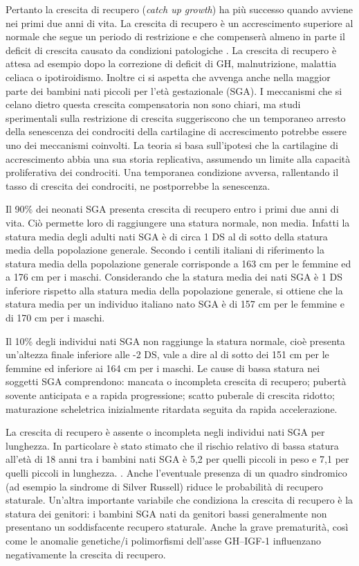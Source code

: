  Pertanto la crescita di recupero (\textit{catch up growth}) ha più successo quando avviene nei primi due anni di vita. La crescita di recupero è un accrescimento superiore al normale che segue un periodo di restrizione e che compenserà almeno in parte il deficit di crescita causato da condizioni patologiche \cite{boersma1997catch}.
La crescita di recupero è attesa ad esempio dopo la correzione di deficit di GH, malnutrizione, malattia celiaca o ipotiroidismo. Inoltre ci si aspetta che avvenga anche nella maggior parte dei bambini nati piccoli per l'età gestazionale (SGA). I meccanismi che si celano dietro questa crescita compensatoria non sono chiari, ma studi sperimentali sulla restrizione di crescita suggeriscono che un temporaneo arresto della senescenza dei condrociti della cartilagine di accrescimento potrebbe essere uno dei meccanismi 
coinvolti.
La teoria si basa sull'ipotesi che la cartilagine di accrescimento abbia una sua storia replicativa, assumendo un limite alla capacità proliferativa dei condrociti. Una temporanea condizione avversa, rallentando il tasso di crescita dei condrociti, ne postporrebbe la senescenza.\cite{gafni2001catch} 


Il 90\% dei neonati SGA presenta crescita di recupero entro i primi due anni di
vita\cite{karlberg1995growth}. Ciò permette loro di raggiungere una statura normale, non media. Infatti la statura media degli adulti nati SGA è di circa 1 DS al di sotto della statura 
media della popolazione generale\cite{leger1997reduced}. Secondo i centili italiani di riferimento \cite{cacciari2006italian} la statura media della popolazione generale corrisponde a 163 cm per le femmine ed a 176 cm per i maschi. Considerando che la statura media dei nati SGA è 1 DS inferiore rispetto alla statura media della popolazione generale,   
si ottiene che la statura media per un individuo italiano nato SGA è di 157 cm per le femmine e di 170 cm per i maschi. 


Il 10\% degli individui nati SGA non raggiunge la statura normale, cioè presenta un'altezza finale inferiore alle -2 DS, vale a dire al di sotto dei 151 cm per le femmine ed inferiore ai 164 cm per i maschi. 
Le cause di bassa statura nei soggetti SGA comprendono: mancata o incompleta crescita di recupero; pubertà sovente anticipata e a rapida progressione; scatto puberale di crescita ridotto; maturazione scheletrica inizialmente ritardata seguita da rapida accelerazione.
 

La crescita di recupero è assente o incompleta negli individui nati SGA per lunghezza. In particolare è stato stimato che il rischio relativo di bassa statura all'età di 18 anni tra i bambini nati SGA è 5,2 per quelli 
piccoli in peso e 7,1 per quelli piccoli in lunghezza. \cite{cianfarani2006hormonal}. Anche l'eventuale presenza di un quadro sindromico (ad esempio la sindrome di Silver Russell) riduce le probabilità di recupero staturale. Un'altra importante variabile che condiziona la crescita di recupero è la statura dei genitori: i bambini SGA nati da genitori bassi generalmente non presentano un soddisfacente recupero staturale. Anche la grave prematurità, così come le anomalie genetiche/i polimorfismi dell'asse GH--IGF-1 influenzano negativamente la crescita di recupero. 


